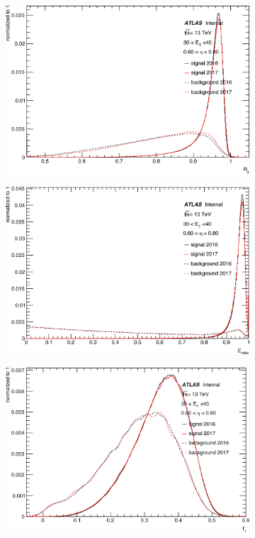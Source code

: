 \begin{figure}[t]\ContinuedFloat
\centering
  \begin{subfigure}[b]{0.49\textwidth}
    \centering
    \includegraphics[width=1.0\textwidth]{figs/egamma/trig_rphi_highet.png} 
    \label{fig:egamma:trig_rphi}
  \end{subfigure}
  \hfill
  \begin{subfigure}[b]{0.49\textwidth}
    \centering
    \includegraphics[width=1.0\textwidth]{figs/egamma/trig_eratio_highet.png} 
    \label{fig:egamma:trig_eratio}
  \end{subfigure}
  \hfill
  \begin{subfigure}[b]{0.49\textwidth}
    \centering
    \includegraphics[width=1.0\textwidth]{figs/egamma/trig_f1_highet.png} 

\end{subfigure}
\end{figure}
